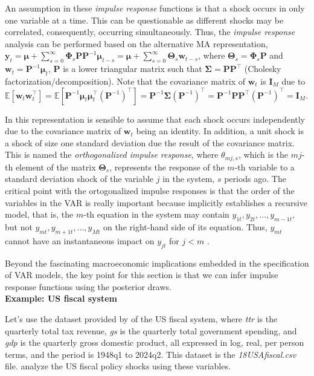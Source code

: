 An assumption in these \textit{impulse response} functions is that a shock occurs in only one variable at a time. This can be questionable as different shocks may be correlated, consequently, occurring simultaneously. Thus, the \textit{impulse response} analysis can be performed based on the alternative MA representation, $\bm{y}_t=\bm{\mu} + \sum_{s=0}^{\infty}\bm{\Phi}_s\bm{P}\bm{P}^{-1}\bm{\mu}_{t-s}=\bm{\mu} + \sum_{s=0}^{\infty}\bm{\Theta}_s\bm{w}_{t-s}$, where $\bm{\Theta}_s=\bm{\Phi}_s\bm{P}$ and $\bm{w}_{t}=\bm{P}^{-1}\bm{\mu}_{t}$, $\bm{P}$ is a lower triangular matrix such that $\bm{\Sigma}=\bm{P}\bm{P}^{\top}$ (Cholesky factorization/decomposition). Note that the covariance matrix of $\bm{w}_t$ is $\bm{I}_M$ due to $\mathbb{E}[\bm{w}_t\bm{w}_t^{\top}]=\mathbb{E}[\bm{P}^{-1}\bm{\mu}_{t}\bm{\mu}_t^{\top}(\bm{P}^{-1})^{\top}]=\bm{P}^{-1}\bm{\Sigma}(\bm{P}^{-1})^{\top}=\bm{P}^{-1}\bm{P}\bm{P}^{\top}(\bm{P}^{-1})^{\top}=\bm{I}_M$. 

In this representation is sensible to assume that each shock occurs independently due to the covariance matrix of $\bm{w}_t$ being an identity. In addition, a unit shock is a shock of size one standard deviation due the result of the covariance matrix. This is named the \textit{orthogonalized impulse response}, where $\theta_{mj,s}$, which is the $mj$-th element of the matrix $\bm{\Theta}_s$, represents the response of the $m$-th variable to a standard deviation shock of the variable $j$ in the system, $s$ periods ago. The critical point with the ortogonalized impulse responses is that the order of the variables in the VAR is really important because implicitly establishes a recursive model, that is, the $m$-th equation in the system may contain $y_{1t}, y_{2t}, \dots, y_{m-1t}$, but not $y_{mt}, y_{m+1t}, \dots, y_{Mt}$ on the right-hand side of its equation. Thus, $y_{mt}$ cannot have an instantaneous impact on $y_{jt}$ for $j<m$ \cite[Chap.~2]{helmut2005new}.

Beyond the fascinating macroeconomic implications embedded in the specification of VAR models, the key point for this section is that we can infer impulse response functions using the posterior draws.\\

\textbf{Example: US fiscal system}

Let's use the dataset provided by \cite{Tomasz2024} of the US fiscal system, where \textit{ttr} is the quarterly total tax revenue, \textit{gs} is the quarterly total government spending, and \textit{gdp} is the quarterly gross domestic product, all expressed in log, real, per person terms, and the period is 1948q1 to 2024q2. This dataset is the \textit{18USAfiscal.csv} file. \cite{mertens2014reconciliation} analyze the US fiscal policy shocks using these variables.

